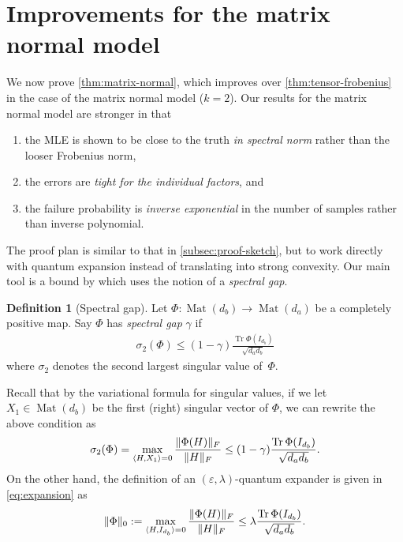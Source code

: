 \documentclass[aos]{imsart}
\theoremstyle{definition}
\newtheorem*{definition}{Definition}
\numberwithin{equation}{section}
\DeclareMathOperator{\Mat}{Mat}
\DeclareMathOperator{\tr}{Tr}
\DeclarePairedDelimiter{\norm}{\lVert}{\rVert}
\newcommand{\eps}{\varepsilon}
\begin{document}
\section{Improvements for the matrix normal model}\label{sec:matrix-normal}
We now prove \cref{thm:matrix-normal}, which improves over \cref{thm:tensor-frobenius} in the case of the matrix normal model ($k=2$).
Our results for the matrix normal model are stronger in that
\begin{enumerate}
\item the MLE is shown to be close to the truth \emph{in spectral norm} rather than the looser Frobenius norm,
\item the errors are \emph{tight for the individual factors}, and
\item the failure probability is \emph{inverse exponential} in the number of samples rather than inverse polynomial.
\end{enumerate}

The proof plan is similar to that in \cref{subsec:proof-sketch}, but to work directly with quantum expansion instead of translating into strong convexity.
Our main tool is a bound by \cite{KLR19} which uses the notion of a \emph{spectral gap}.

\begin{definition}[Spectral gap]
Let $\Phi\colon\Mat(d_b) \to \Mat(d_a)$ be a completely positive map.
Say $\Phi$ has \emph{spectral gap} $\gamma$ if
\begin{align}\label{eq:spectral-gap}
  \sigma_2(\Phi) \leq (1 - \gamma) \frac{\tr \Phi(I_{d_b})}{\sqrt{d_a d_b}}
\end{align}
where $\sigma_2$ denotes the second largest singular value of~$\Phi$.
\end{definition}

Recall that by the variational formula for singular values, if we let $X_{1} \in \Mat(d_{b})$ be the first (right) singular vector of $\Phi$, we can rewrite the above condition as 
\begin{align*}
  \sigma_2(\Phi) = \max_{\langle H, X_{1} \rangle = 0} \frac{\norm{\Phi(H)}_{F}}{\norm{H}_{F}} \leq (1 - \gamma) \frac{\tr \Phi(I_{d_b})}{\sqrt{d_a d_b}} .
\end{align*}
On the other hand, the definition of an $(\eps,\lambda)$-quantum expander is given in \cref{eq:expansion} as
\begin{align*}
      \norm{\Phi}_0 := \max_{\langle H, I_{d_{b}} \rangle = 0} \frac{\norm{\Phi(H)}_F}{\norm{H}_{F}} 
\leq \lambda \frac{\tr \Phi(I_{d_b})}{\sqrt{d_a d_b}}  .
\end{align*}
\end{document}

